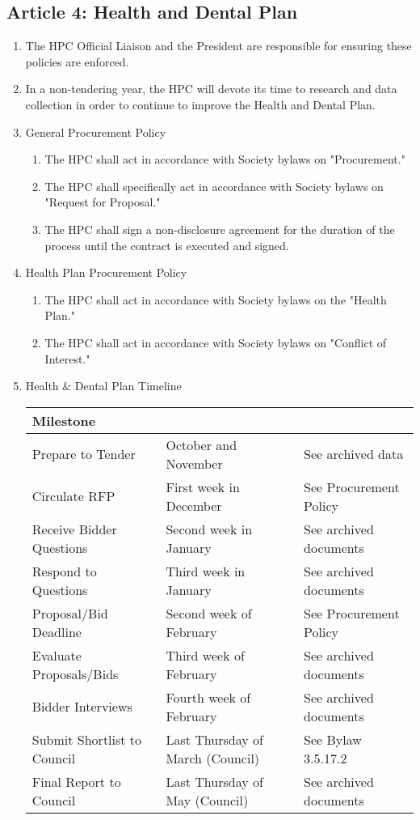 \subsection{Article 4: Health and Dental Plan}
\begin{enumerate} [label*=\arabic*., align=left]	
\item The HPC Official Liaison and the President are responsible for ensuring these policies are enforced.
\item In a non-tendering year, the HPC will devote its time to research and data collection in order to continue to improve the Health and Dental Plan.
\item General Procurement Policy
\begin{enumerate}[label*=\arabic*., align=left]	
\item The HPC shall act in accordance with Society bylaws on "Procurement."
\item The HPC shall specifically act in accordance with Society bylaws on "Request for Proposal."
\item The HPC shall sign a non-disclosure agreement for the duration of the process until the
contract is executed and signed.
\end{enumerate}
\item Health Plan Procurement Policy
\begin{enumerate} [label*=\arabic*., align=left]	
\item The HPC shall act in accordance with Society bylaws on the "Health Plan."
\item The HPC shall act in accordance with Society bylaws on "Conflict of Interest."
\end{enumerate}
\item Health \& Dental Plan Timeline

\begin{tabular}{|l|l|l|}
\hline 
\multicolumn{3}{|l|}{\textbf{Milestone}} \\ 
\hline 
Prepare to Tender & October and November & See archived data \\ 
\hline 
Circulate RFP & First week in December & See Procurement Policy \\ 
\hline 
Receive Bidder Questions & Second week in January & See archived documents \\ 
\hline 
Respond to Questions & Third week in January & See archived documents \\ 
\hline 
Proposal/Bid Deadline & Second week of February & See Procurement Policy \\ 
\hline 
Evaluate Proposals/Bids & Third week of February & See archived documents \\ 
\hline 
Bidder Interviews & Fourth week of February & See archived documents \\ 
\hline 
Submit Shortlist to Council & Last Thursday of  March (Council) & See Bylaw 3.5.17.2 \\ 
\hline 
Final Report to Council & Last Thursday of \newline May (Council) & See archived documents \\ 
\hline 
\end{tabular}



\end{enumerate}
